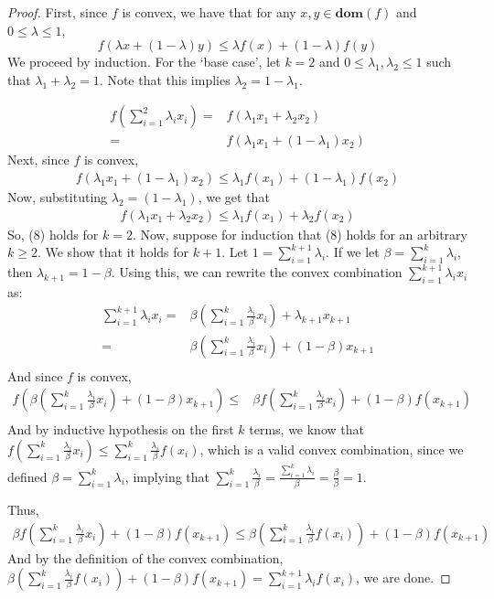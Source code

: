 \documentclass[10pt]{article}
\newcommand{\domain}[1]{\mathbf{dom}(#1)}
\theoremstyle{remark}
\theoremstyle{definition}
\begin{document}
\begin{proof}
	First, since $f$ is convex, we have that for any $x,y \in \domain{f}$ 
	and $0 \leq \lambda \leq 1$, 
	\[ f(\lambda x + (1-\lambda)y) \leq \lambda f(x) + (1-\lambda)f(y) \]
	We proceed by induction. For the `base case', let $k=2$ and $0 \leq \lambda_1, \lambda_2 \leq 1$ 
	such that $\lambda_1 + \lambda_2 = 1$. Note that this implies $\lambda_2 = 1-\lambda_1$. 

	\begin{align*}
		f\left(\sum_{i=1}^2 \lambda_i x_i\right) =& f(\lambda_1 x_1 + \lambda_2 x_2)\\
		=& f(\lambda_1 x_1 + (1-\lambda_1)x_2)  
	\end{align*}
	Next, since $f$ is convex,
	\begin{align*}
		f(\lambda_1 x_1 + (1-\lambda_1)x_2)   \leq \lambda_1 f(x_1) + (1-\lambda_1)f(x_2)
	\end{align*}
	Now, substituting $\lambda_2 = (1-\lambda_1)$, we get that 
	\begin{align*}
		f(\lambda_1 x_1 + \lambda_2x_2)\leq \lambda_1 f(x_1) + \lambda_2f(x_2)
	\end{align*}
	So, (8) holds for $k=2$. Now, suppose for induction that (8) holds for an 
	arbitrary $k \geq 2$. We show that it holds for $k+1$. Let 
	$1 = \sum_{i=1}^{k+1}\lambda_i$. If we let $\beta = \sum_{i=1}^{k}\lambda_i$, 
	then $\lambda_{k+1} = 1-\beta$. Using this, we can rewrite 
	the convex combination $\sum_{i=1}^{k+1} \lambda_i x_i$ as:
	\begin{align*}
		\sum_{i=1}^{k+1}\lambda_i x_i =& \beta \left(\sum_{i=1}^k \frac{\lambda_i}{\beta} x_i \right)+ \lambda_{k+1}x_{k+1}\\
		=& \beta \left(\sum_{i=1}^k \frac{\lambda_i}{\beta} x_i \right)+ (1-\beta)x_{k+1}\\
	\end{align*}
	And since $f$ is convex, 
	\begin{align*}
		f\left(\beta \left(\sum_{i=1}^k \frac{\lambda_i}{\beta} x_i \right)+ ( 1 - \beta)x_{k+1}\right) \leq& \beta f\left(\sum_{i=1}^k \frac{\lambda_i}{\beta}x_i\right) + (1-\beta)f(x_{k+1})\\
	\end{align*}
	And by inductive hypothesis on the first $k$ terms, we know that 
	$f\left(\sum_{i=1}^k \frac{\lambda_i}{\beta} x_i\right) \leq \sum_{i=1}^k \frac{\lambda_i}{\beta} f(x_i)$,
	which is a valid convex combination, since we defined $\beta = \sum_{i=1}^k \lambda_i$, implying that 
	$\sum_{i=1}^k\frac{\lambda_i}{\beta} = \frac{\sum_{i=1}^k\lambda_i}{\beta} = \frac{\beta}{\beta }=1$.

	Thus, 
	\begin{align*}
		\beta f\left(\sum_{i=1}^k \frac{\lambda_i}{\beta}x_i\right) + (1-\beta)f(x_{k+1}) \leq \beta \left(\sum_{i=1}^k\frac{\lambda_i}{\beta}f(x_i) \right)+ (1-\beta)f(x_{k+1})
	\end{align*}
	And by the definition of the convex combination, $ \beta \left(\sum_{i=1}^k\frac{\lambda_i}{\beta}f(x_i) \right)+ (1-\beta)f(x_{k+1})= \sum_{i=1}^{k+1}\lambda_i f(x_i)$, we are done.
\end{proof}
\end{document}
